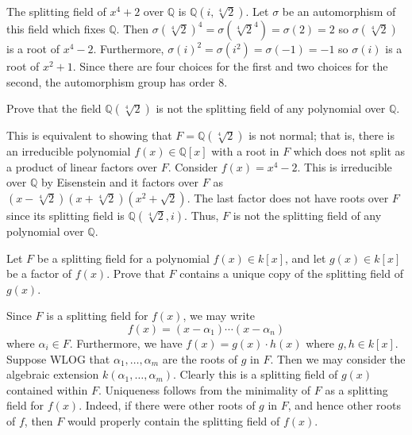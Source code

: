 \documentclass[../../master.tex]{subfiles}
\begin{document}
\begin{solution}
    The splitting field of $x^{4} + 2$ over $\mathbb{Q}$ is $\mathbb{Q}(i, \sqrt[4]{2})$.
    Let $\sigma$ be an automorphism of this field which fixes $\mathbb{Q}$.
    Then $\sigma(\sqrt[4]{2})^{4} = \sigma(\sqrt[4]{2}^{4}) = \sigma(2) = 2$ so $\sigma( \sqrt[4]{2})$ is a root of $x^{4} - 2$.
    Furthermore, $\sigma(i)^2 = \sigma(i^2) = \sigma(-1) = -1$ so $\sigma(i)$ is a root of $x^2 + 1$.
    Since there are four choices for the first and two choices for the second, the automorphism group has order 8.
\end{solution}

\begin{problem}
    Prove that the field $\mathbb{Q}(\sqrt[4]{2})$ is not the splitting field of any polynomial over $\mathbb{Q}$.
\end{problem}

\begin{solution}
    This is equivalent to showing that $F = \mathbb{Q}(\sqrt[4]{2})$ is not normal; that is, there is an irreducible polynomial $f(x) \in \mathbb{Q}[x]$ with a root in $F$ which does not split as a product of linear factors over $F$.
    Consider $f(x) = x^4 - 2$.
    This is irreducible over $\mathbb{Q}$ by Eisenstein and it factors over $F$ as $(x - \sqrt[4]{2})(x + \sqrt[4]{2})(x^2 + \sqrt{2})$.
    The last factor does not have roots over $F$ since its splitting field is $\mathbb{Q}(\sqrt[4]{2}, i)$.
    Thus, $F$ is not the splitting field of any polynomial over $\mathbb{Q}$.
\end{solution}

\begin{problem}
    Let $F$ be a splitting field for a polynomial $f(x) \in k[x]$, and let $g(x) \in k[x]$ be a factor of $f(x)$.
    Prove that $F$ contains a unique copy of the splitting field of $g(x)$.
\end{problem}

\begin{solution}
    Since $F$ is a splitting field for $f(x)$, we may write
    \[
        f(x) = (x - \alpha_1) \cdots (x - \alpha_n)
    \]
    where $\alpha_i \in F$.
    Furthermore, we have $f(x) = g(x) \cdot h(x)$ where $g, h \in k[x]$.
    Suppose WLOG that $\alpha_1, \ldots, \alpha_m$ are the roots of $g$ in $F$.
    Then we may consider the algebraic extension $k(\alpha_1, \ldots, \alpha_m)$.
    Clearly this is a splitting field of $g(x)$ contained within $F$.
    Uniqueness follows from the minimality of $F$ as a splitting field for $f(x)$.
    Indeed, if there were other roots of $g$ in $F$, and hence other roots of $f$, then $F$ would properly contain the splitting field of $f(x)$.
\end{solution}
\end{document}
